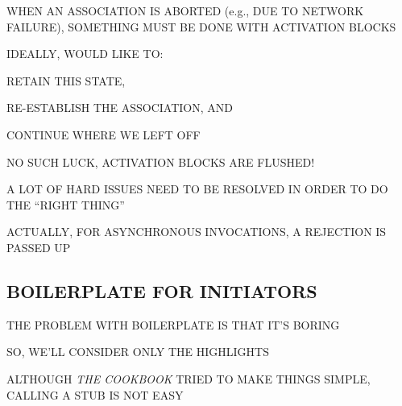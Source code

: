 \begin{bwslide}

\begin{nrtc}
\item	WHEN AN ASSOCIATION IS ABORTED (e.g., DUE TO NETWORK FAILURE),
	SOMETHING MUST BE DONE WITH ACTIVATION BLOCKS

\item	IDEALLY, WOULD LIKE TO:
    \begin{nrtc}
    \item	RETAIN THIS STATE,

    \item	RE-ESTABLISH THE ASSOCIATION, AND

    \item	CONTINUE WHERE WE LEFT OFF
    \end{nrtc}

\item	NO SUCH LUCK, ACTIVATION BLOCKS ARE FLUSHED!
    \begin{nrtc}
    \item	A LOT OF HARD ISSUES NEED TO BE RESOLVED IN ORDER TO DO THE
		``RIGHT THING''

    \item	ACTUALLY, FOR ASYNCHRONOUS INVOCATIONS, A REJECTION IS
		PASSED UP
    \end{nrtc}
\end{nrtc}
\end{bwslide}


\begin{bwslide}
\part*	{BOILERPLATE FOR INITIATORS}\bf

\begin{nrtc}
\item	THE PROBLEM WITH BOILERPLATE IS THAT IT'S BORING

\item	SO, WE'LL CONSIDER ONLY THE HIGHLIGHTS
\end{nrtc}
\end{bwslide}


\begin{bwslide}

\begin{nrtc}
\item	ALTHOUGH \emph{THE COOKBOOK} TRIED TO MAKE THINGS SIMPLE,
	CALLING A STUB IS NOT EASY
\end{nrtc}
\end{bwslide}


